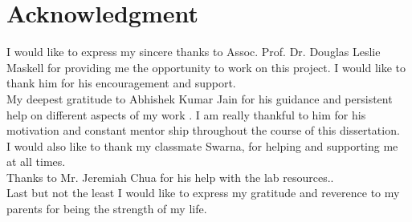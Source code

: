 
\chapter*{Acknowledgment} 
\label{ch0_Acknowledgement}
I would like to express my sincere thanks to Assoc. Prof. Dr. Douglas Leslie Maskell for providing me the opportunity to work on this project. I would like to thank him for his encouragement and support. \\
My deepest gratitude to Abhishek Kumar Jain for his guidance and persistent help on different aspects of my work . I am really thankful to him for his motivation and constant mentor ship throughout the course of this dissertation.\\
I would also like to thank my classmate Swarna, for helping and supporting me at all times.\\
Thanks to Mr. Jeremiah Chua for his help with the lab resources..\\
Last but not the least I would like to express my gratitude and reverence to my parents for being the strength of my life.

% 
% 
% 
%  
% 






